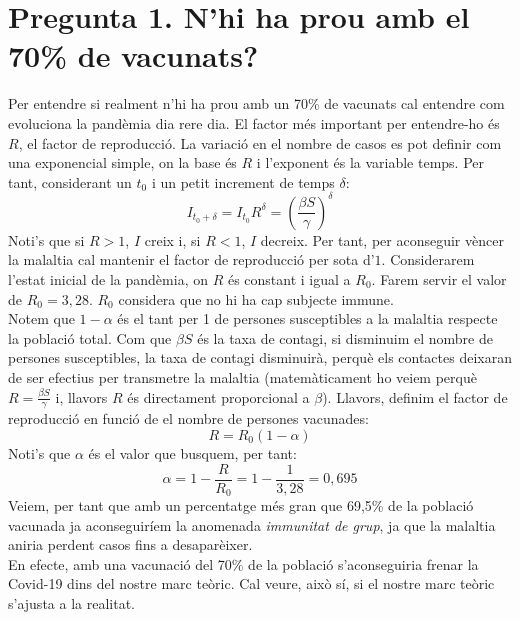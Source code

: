 \documentclass[a4paper, 11pt]{article}
\begin{document}
\section{Pregunta 1. N'hi ha prou amb el 70\% de vacunats?}
  Per entendre si realment n'hi ha prou amb un 70\% de vacunats cal entendre com evoluciona la pandèmia dia rere dia. El factor més important per entendre-ho és $R$, el factor de reproducció. La variació en el nombre de casos es pot definir com una exponencial simple, on la base és $R$ i l'exponent és la variable temps. Per tant, considerant un $t_0$ i un petit increment de temps $\delta$:
  \begin{equation}
    I_{t_{0} + \delta} = I_{t_{0}} R^{\delta} = {\left( \frac{\beta S}{\gamma} \right)} ^{\delta}
  \end{equation}
  Noti's que si $R > 1$, $I$ creix i, si $R < 1$, $I$ decreix.
  Per tant, per aconseguir vèncer la malaltia cal mantenir el factor de reproducció per sota d'$1$. Considerarem l'estat inicial de la pandèmia, on $R$ és constant i igual a $R_0$. Farem servir el valor de $R_0 = 3,28$\cite{jtm}. $R_0$ considera que no hi ha cap subjecte immune.\\
  Notem que $1 - \alpha$ és el tant per 1 de persones susceptibles a la malaltia respecte la població total. Com que $\beta S$ és la taxa de contagi, si disminuim el nombre de persones susceptibles, la taxa de contagi disminuirà, perquè els contactes deixaran de ser efectius per transmetre la malaltia (matemàticament ho veiem perquè $R = \frac{\beta S}{\gamma}$ i, llavors $R$ és directament proporcional a $\beta$). Llavors, definim el factor de reproducció en funció de el nombre de persones vacunades:
  \begin{equation}
    R = R_0 \left( 1 - \alpha \right)
  \end{equation}
  Noti's que $\alpha$ és el valor que busquem, per tant:
  \begin{equation}
    \alpha = 1 - \frac{R}{R_0} = 1 - \frac{1}{3,28} = 0,695
  \end{equation}
  Veiem, per tant que amb un percentatge més gran que 69,5\% de la població vacunada ja aconseguiríem la anomenada \textit{immunitat de grup}\cite{herd}, ja que la malaltia aniria perdent casos fins a desaparèixer.\\
  En efecte, amb una vacunació del 70\% de la població s'aconseguiria frenar la Covid-19 dins del nostre marc teòric. Cal veure, això sí, si el nostre marc teòric s'ajusta a la realitat.
\end{document}
